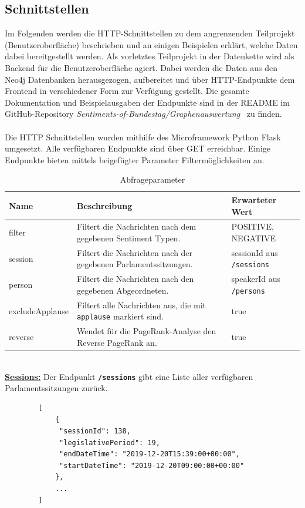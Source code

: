 \subsection{Schnittstellen}
Im Folgenden werden die HTTP-Schnittstellen zu dem angrenzenden Teilprojekt (Benutzeroberfläche) beschrieben und an einigen Beispielen erklärt, welche Daten dabei bereitgestellt werden. Als vorletztes Teilprojekt in der Datenkette wird als Backend für die Benutzeroberfläche agiert. Dabei werden die Daten aus den Neo4j Datenbanken herausgezogen, aufbereitet und über HTTP-Endpunkte dem Frontend in verschiedener Form zur Verfügung gestellt. Die gesamte Dokumentation und Beispielausgaben der Endpunkte sind in der README im GitHub-Repository \textit{Sentiments-of-Bundestag/Graphenauswertung}~\cite{github_endpoints} zu finden.
\\~\\
Die HTTP Schnittstellen wurden mithilfe des Microframework Python Flask \cite{flask} umgesetzt. Alle verfügbaren Endpunkte sind über GET erreichbar. Einige Endpunkte bieten mittels beigefügter Parameter Filtermöglichkeiten an. 
\begin{table}[ht]
	\caption{Abfrageparameter}
	\label{tab:filter}
	\begin{tabular}{|p{3 cm}|p{8.5 cm}|p{2.5 cm}|}
		\hline
		\textbf{Name} & \textbf{Beschreibung} & \textbf{Erwarteter Wert} \\
		\hline
		filter & Filtert die Nachrichten nach dem gegebenen Sentiment Typen. & POSITIVE, NEGATIVE \\
		\hline
		session & Filtert die Nachrichten nach der gegebenen Parlamentssitzungen. & sessionId aus \texttt{/sessions} \\
		\hline
		person & Filtert die Nachrichten nach den gegebenen Abgeordneten. & speakerId aus \texttt{/persons} \\
		\hline
		excludeApplause & Filtert alle Nachrichten aus, die mit \texttt{applause} markiert sind. & true \\
		\hline
		reverse & Wendet für die PageRank-Analyse den Reverse PageRank an. & true \\
		\hline
	\end{tabular}
\end{table} 
~\\
\textbf{\underline{Sessions:}}\newline
Der Endpunkt \textbf{\texttt{/sessions}} gibt eine Liste aller verfügbaren Parlamentssitzungen zurück.
\begin{lstlisting}
		[
			{
			 "sessionId": 138, 
			 "legislativePeriod": 19, 
			 "endDateTime": "2019-12-20T15:39:00+00:00", 
			 "startDateTime": "2019-12-20T09:00:00+00:00"
			},
			...
		]
\end{lstlisting}	
